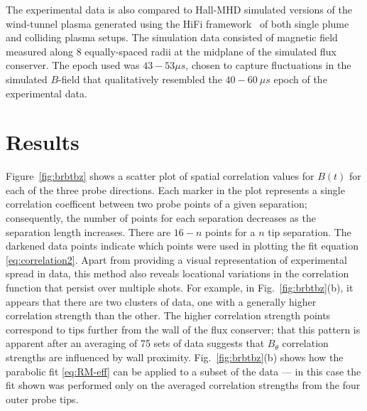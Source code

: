 \documentclass[aip,prl,amsmath,amssymb,reprint,superscriptaddress]{revtex4-1} %
\begin{document}
The experimental data is also compared to Hall-MHD simulated versions of the wind-tunnel plasma generated using the HiFi framework~\cite{schaffner14a} of both single plume and colliding plasma setups. The simulation data consisted of magnetic field measured along 8 equally-spaced radii at the midplane of the simulated flux conserver. The epoch used was $43-53 \mu s$, chosen to capture fluctuations in the simulated $B$-field that qualitatively resembled the $40-60\ \mu s$ epoch of the experimental data. 


\section{Results}

Figure~\ref{fig:brbtbz} shows a scatter plot of spatial correlation values for $B(t)$ for each of the three probe directions. Each marker in the plot represents a single correlation coefficent between two probe points of a given separation; consequently, the number of points for each separation decreases as the separation length increases. There are $16-n$ points for a $n$ tip separation. The darkened data points indicate which points were used in plotting the fit equation \eqref{eq:correlation2}. Apart from providing a visual representation of experimental spread in data, this method also reveals locational variations in the correlation function that persist over multiple shots. For example, in Fig.\ \ref{fig:brbtbz}(b), it appears that there are two clusters of data, one with a generally higher correlation strength than the other. The higher correlation strength points correspond to tips further from the wall of the flux conserver; that this pattern is apparent after an averaging of 75 sets of data suggests that $B_\theta$ correlation strengths are influenced by wall proximity. Fig.\ \ref{fig:brbtbz}(b) shows how the parabolic fit \eqref{eq:RM-eff} can be applied to a subset of the data --- in this case the fit shown was performed only on the averaged correlation strengths from the four outer probe tips.
\end{document}
